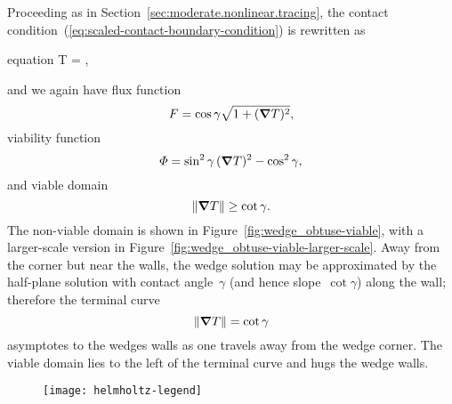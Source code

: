 Proceeding as in Section~\ref{sec:moderate.nonlinear.tracing},
the contact condition~(\ref{eq:scaled-contact-boundary-condition})
is rewritten as
\begin{important}{equation}
  \normalvec \dotp \del T = \cos\gamma {},
  \label{eq:re-entrant-flux-boundary-condition}
\end{important}
and we again have flux function
\begin{equation}
  F = \cos\gamma \sqrt{1 + (\mathop{}\!\boldsymbol{\mathbf{\nabla}} T)^2},
  \label{eq:re-entrant-flux-function}
\end{equation}
viability function
\begin{equation}
  \varPhi = \sin^2\gamma \, (\mathop{}\!\boldsymbol{\mathbf{\nabla}} T)^2 - \cos^2\gamma,
  \label{eq:re-entrant-viability-function}
\end{equation}
and viable domain
\begin{equation}
  \lVert\mathop{}\!\boldsymbol{\mathbf{\nabla}} T\rVert \ge \cot\gamma.
  \label{eq:re-entrant-viable-domain}
\end{equation}
The non-viable domain is shown
in Figure~\ref{fig:wedge_obtuse-viable},
with a larger-scale version
in Figure~\ref{fig:wedge_obtuse-viable-larger-scale}.
Away from the corner but near the walls,
the wedge solution may be approximated by the half-plane solution
with contact angle~$\gamma$
(and hence slope~$\cot\gamma$)
along the wall;
therefore the terminal curve
\begin{equation}
  \lVert\mathop{}\!\boldsymbol{\mathbf{\nabla}} T\rVert = \cot\gamma
  \label{eq:re-entrant-terminal-curve}
\end{equation}
asymptotes to the wedges walls as one travels away from the wedge corner.
The viable domain lies to the left of the terminal curve
and hugs the wedge walls.

\begin{figure}
  \texttt{[image: helmholtz-legend]}
  \begin{minipage}[t]{0.5\textwidth}
  \end{minipage}
  \begin{minipage}[t]{0.5\textwidth}
  \end{minipage}
\end{figure}

